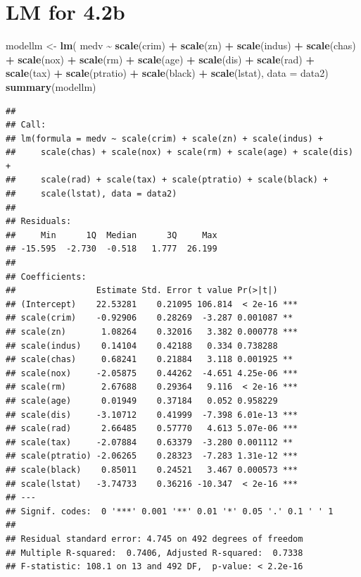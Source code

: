 \documentclass[
]{article}
\newenvironment{Shaded}{\begin{snugshade}}{\end{snugshade}}
\newcommand{\AttributeTok}[1]{\textcolor[rgb]{0.13,0.29,0.53}{#1}}
\newcommand{\FunctionTok}[1]{\textcolor[rgb]{0.13,0.29,0.53}{\textbf{#1}}}
\newcommand{\NormalTok}[1]{#1}
\newcommand{\OtherTok}[1]{\textcolor[rgb]{0.56,0.35,0.01}{#1}}
\newcommand{\SpecialCharTok}[1]{\textcolor[rgb]{0.81,0.36,0.00}{\textbf{#1}}}
\begin{document}
\section{LM for 4.2b}\label{lm-for-4.2b}

\begin{Shaded}
\begin{Highlighting}[]
\NormalTok{modellm }\OtherTok{\textless{}{-}} \FunctionTok{lm}\NormalTok{( medv }\SpecialCharTok{\textasciitilde{}}
            \FunctionTok{scale}\NormalTok{(crim) }\SpecialCharTok{+} \FunctionTok{scale}\NormalTok{(zn) }\SpecialCharTok{+} \FunctionTok{scale}\NormalTok{(indus) }\SpecialCharTok{+}
           \FunctionTok{scale}\NormalTok{(chas) }\SpecialCharTok{+} \FunctionTok{scale}\NormalTok{(nox) }\SpecialCharTok{+} \FunctionTok{scale}\NormalTok{(rm) }\SpecialCharTok{+} \FunctionTok{scale}\NormalTok{(age) }\SpecialCharTok{+} \FunctionTok{scale}\NormalTok{(dis) }\SpecialCharTok{+} \FunctionTok{scale}\NormalTok{(rad) }\SpecialCharTok{+}
           \FunctionTok{scale}\NormalTok{(tax) }\SpecialCharTok{+} \FunctionTok{scale}\NormalTok{(ptratio) }\SpecialCharTok{+} \FunctionTok{scale}\NormalTok{(black) }\SpecialCharTok{+}
           \FunctionTok{scale}\NormalTok{(lstat), }\AttributeTok{data =}\NormalTok{ data2)}
\FunctionTok{summary}\NormalTok{(modellm)}
\end{Highlighting}
\end{Shaded}

\begin{verbatim}
## 
## Call:
## lm(formula = medv ~ scale(crim) + scale(zn) + scale(indus) + 
##     scale(chas) + scale(nox) + scale(rm) + scale(age) + scale(dis) + 
##     scale(rad) + scale(tax) + scale(ptratio) + scale(black) + 
##     scale(lstat), data = data2)
## 
## Residuals:
##     Min      1Q  Median      3Q     Max 
## -15.595  -2.730  -0.518   1.777  26.199 
## 
## Coefficients:
##                Estimate Std. Error t value Pr(>|t|)    
## (Intercept)    22.53281    0.21095 106.814  < 2e-16 ***
## scale(crim)    -0.92906    0.28269  -3.287 0.001087 ** 
## scale(zn)       1.08264    0.32016   3.382 0.000778 ***
## scale(indus)    0.14104    0.42188   0.334 0.738288    
## scale(chas)     0.68241    0.21884   3.118 0.001925 ** 
## scale(nox)     -2.05875    0.44262  -4.651 4.25e-06 ***
## scale(rm)       2.67688    0.29364   9.116  < 2e-16 ***
## scale(age)      0.01949    0.37184   0.052 0.958229    
## scale(dis)     -3.10712    0.41999  -7.398 6.01e-13 ***
## scale(rad)      2.66485    0.57770   4.613 5.07e-06 ***
## scale(tax)     -2.07884    0.63379  -3.280 0.001112 ** 
## scale(ptratio) -2.06265    0.28323  -7.283 1.31e-12 ***
## scale(black)    0.85011    0.24521   3.467 0.000573 ***
## scale(lstat)   -3.74733    0.36216 -10.347  < 2e-16 ***
## ---
## Signif. codes:  0 '***' 0.001 '**' 0.01 '*' 0.05 '.' 0.1 ' ' 1
## 
## Residual standard error: 4.745 on 492 degrees of freedom
## Multiple R-squared:  0.7406, Adjusted R-squared:  0.7338 
## F-statistic: 108.1 on 13 and 492 DF,  p-value: < 2.2e-16
\end{verbatim}
\end{document}
